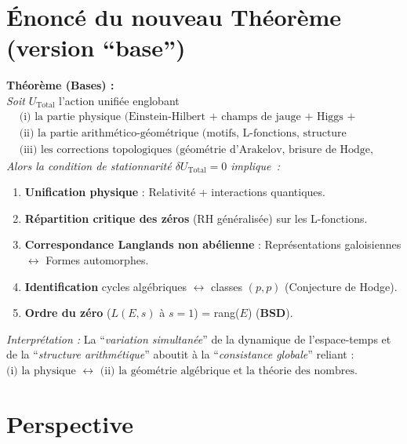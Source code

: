 \documentclass[11pt]{article}
\begin{document}
\section{Énoncé du nouveau Théorème (version “base”)}

\noindent
\textbf{Théorème (Bases) :}\\
\emph{Soit} 
\(\displaystyle U_{\mathrm{Total}}\)
l'action unifiée englobant
\[
\begin{aligned}
&\text{(i) la partie physique (Einstein-Hilbert + champs de jauge + Higgs + fermions),}\\
&\text{(ii) la partie arithmético-géométrique (motifs, L-fonctions, structure cohomologique),}\\
&\text{(iii) les corrections topologiques (géométrie d'Arakelov, brisure de Hodge, etc.).}
\end{aligned}
\]
\emph{Alors la condition de stationnarité \(\delta U_{\mathrm{Total}}=0\) implique~:}
\begin{enumerate}
  \item \textbf{Unification physique} : Relativité + interactions quantiques.
  \item \textbf{Répartition critique des zéros} (RH généralisée) sur les L-fonctions.
  \item \textbf{Correspondance Langlands non abélienne} : Représentations galoisiennes $\leftrightarrow$ Formes automorphes.
  \item \textbf{Identification} cycles algébriques $\leftrightarrow$ classes $(p,p)$ (Conjecture de Hodge).
  \item \textbf{Ordre du zéro} ($L(E,s)$ à $s=1$) = rang($E$) (\textbf{BSD}).
\end{enumerate}

\noindent
\emph{Interprétation :}
La “\emph{variation simultanée}” de la dynamique de l'espace-temps et de la “\emph{structure arithmétique}” aboutit à la “\emph{consistance globale}” reliant : \\
\(\text{(i) la physique}\)
\(\longleftrightarrow\)
\(\text{(ii) la géométrie algébrique et la théorie des nombres}.\)

\section{Perspective}
\end{document}

